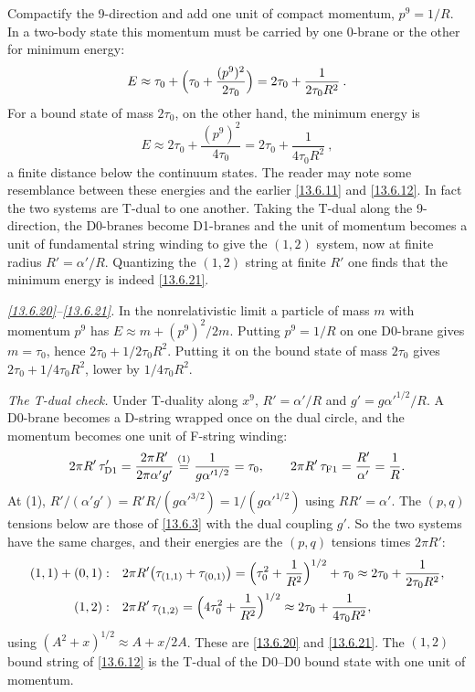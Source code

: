 Compactify the 9-direction and add one unit of compact momentum, $p^9 = 1/R$. In a two-body state this momentum must be carried by one 0-brane or the other for minimum energy:
\begin{equation}
	E \approx \tau_0 + \Bigl(\tau_0 + \frac{(p^9)^2}{2\tau_0}\Bigr) = 2\tau_0 + \frac{1}{2\tau_0 R^2} \:. \label{13.6.20}
\end{equation}
For a bound state of mass $2\tau_0$, on the other hand, the minimum energy is
\begin{equation}
	E \approx 2\tau_0 + \frac{(p^9)^2}{4\tau_0} = 2\tau_0 + \frac{1}{4\tau_0 R^2} \:, \label{13.6.21}
\end{equation}
a finite distance below the continuum states. The reader may note some resemblance between these energies and the earlier \eqref{13.6.11} and \eqref{13.6.12}. In fact the two systems are T-dual to one another. Taking the T-dual along the 9-direction, the D0-branes become D1-branes and the unit of momentum becomes a unit of fundamental string winding to give the $(1,2)$ system, now at finite radius $R' = \alpha'/R$. Quantizing the $(1,2)$ string at finite $R'$ one finds that the minimum energy is indeed \eqref{13.6.21}.
\begin{tcolorbox}[breakable]
	\begin{remark}
		\textit{\eqref{13.6.20}--\eqref{13.6.21}.} In the nonrelativistic limit a particle of mass $m$ with momentum $p^9$ has $E\approx m+(p^9)^2/2m$. Putting $p^9=1/R$ on one D0-brane gives $m=\tau_0$, hence $2\tau_0+1/2\tau_0R^2$. Putting it on the bound state of mass $2\tau_0$ gives $2\tau_0+1/4\tau_0R^2$, lower by $1/4\tau_0R^2$.

		\textit{The T-dual check.} Under T-duality along $x^9$, $R'=\alpha'/R$ and $g'=g\alpha'^{1/2}/R$. A D0-brane becomes a D-string wrapped once on the dual circle, and the momentum becomes one unit of F-string winding:
		\begin{align*}
			2\pi R'\,\tau'_{\rm D1} = \frac{2\pi R'}{2\pi\alpha'g'} \overset{(1)}{=} \frac{1}{g\alpha'^{1/2}} = \tau_0,\qquad
			2\pi R'\,\tau_{\rm F1} = \frac{R'}{\alpha'} = \frac1R .
		\end{align*}
		At (1), $R'/(\alpha'g')=R'R/(g\alpha'^{3/2})=1/(g\alpha'^{1/2})$ using $RR'=\alpha'$. The $(p,q)$ tensions below are those of \eqref{13.6.3} with the dual coupling $g'$. So the two systems have the same charges, and their energies are the $(p,q)$ tensions times $2\pi R'$:
		\begin{align*}
			(1,1)+(0,1):&\quad 2\pi R'\bigl(\tau_{(1,1)}+\tau_{(0,1)}\bigr)=\Bigl(\tau_0^2+\frac1{R^2}\Bigr)^{1/2}+\tau_0 \approx 2\tau_0+\frac{1}{2\tau_0R^2},\\
			(1,2):&\quad 2\pi R'\,\tau_{(1,2)}=\Bigl(4\tau_0^2+\frac1{R^2}\Bigr)^{1/2}\approx 2\tau_0+\frac{1}{4\tau_0R^2},
		\end{align*}
		using $(A^2+x)^{1/2}\approx A+x/2A$. These are \eqref{13.6.20} and \eqref{13.6.21}. The $(1,2)$ bound string of \eqref{13.6.12} is the T-dual of the D0--D0 bound state with one unit of momentum.
	\end{remark}
\end{tcolorbox}

